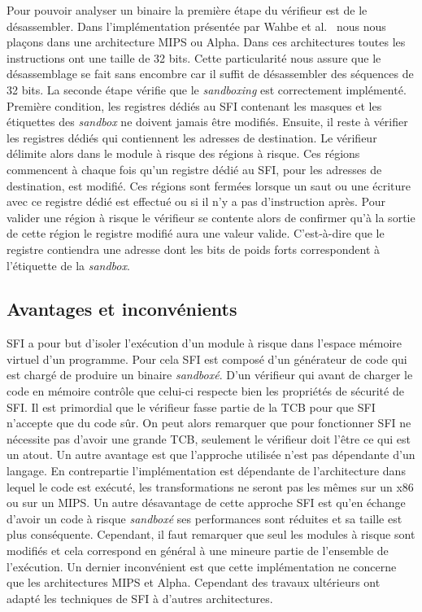 \documentclass[11pt]{sdm}
\begin{document}
Pour pouvoir analyser un binaire la première étape du vérifieur est de le désassembler. Dans l'implémentation présentée par Wahbe et al.~\cite{Wahbe:1993:ESF:173668.168635} nous nous plaçons dans une architecture MIPS ou Alpha. Dans ces architectures toutes les instructions ont une taille de 32 bits. Cette particularité nous assure que le désassemblage se fait sans encombre car il suffit de désassembler des séquences de 32 bits.
La seconde étape vérifie que le \textit{sandboxing} est correctement implémenté. Première condition, les registres dédiés au SFI contenant les masques et les étiquettes des \textit{sandbox} ne doivent jamais être modifiés. Ensuite, il reste à vérifier les registres dédiés qui contiennent les adresses de destination. Le vérifieur délimite alors dans le module à risque des régions à risque. Ces régions commencent à chaque fois qu'un registre dédié au SFI, pour les adresses de destination, est modifié. Ces régions sont fermées lorsque un saut ou une écriture avec ce registre dédié est effectué ou si il n'y a pas d'instruction après. Pour valider une région à risque le vérifieur se contente alors de confirmer qu'à la sortie de cette région le registre modifié aura une valeur valide. C'est-à-dire que le registre contiendra une adresse dont les bits de poids forts correspondent à l'étiquette de la \textit{sandbox}.

\subsection{Avantages et inconvénients}

SFI a pour but d'isoler l'exécution d'un module à risque dans l'espace mémoire virtuel d'un programme. Pour cela SFI est composé d'un générateur de code qui est chargé de produire un binaire \textit{sandboxé}. D'un vérifieur qui avant de charger le code en mémoire contrôle que celui-ci respecte bien les propriétés de sécurité de SFI. Il est primordial que le vérifieur fasse partie de la TCB pour que SFI n'accepte que du code sûr. On peut alors remarquer que pour fonctionner SFI ne nécessite pas d'avoir une grande TCB, seulement le vérifieur doit l'être ce qui est un atout. Un autre avantage est que l'approche utilisée n'est pas dépendante d'un langage. En contrepartie l'implémentation est dépendante de l'architecture dans lequel le code est exécuté, les transformations ne seront pas les mêmes sur un x86 ou sur un MIPS. Un autre désavantage de cette approche SFI est qu'en échange d'avoir un code à risque \textit{sandboxé} ses performances sont réduites et sa taille est plus conséquente. Cependant, il faut remarquer que seul les modules à risque sont modifiés et cela correspond en général à une mineure partie de l'ensemble de l'exécution. Un dernier inconvénient est que cette implémentation ne concerne que les architectures MIPS et Alpha. Cependant des travaux ultérieurs ont adapté les techniques de SFI à d'autres architectures.
\end{document}
